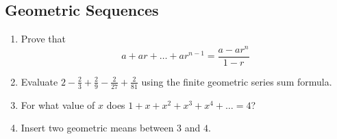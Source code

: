 \documentclass{article}
\begin{document}
\begin{multicols}{2}
        \subsection*{Geometric Sequences}
        \begin{enumerate}[resume]
            \item Prove that
            \[a + ar + \dots + ar^{n - 1} = \frac{a - ar^n}{1 - r}\]
            \vspace{3cm}
            \item Evaluate $2 - \frac{2}{3} + \frac{2}{9} - \frac{2}{27} +
            \frac{2}{81}$ using the finite geometric series sum formula.
            \vspace{3cm}
            \item For what value of $x$ does $1 + x + x^2 + x^3 + x^4 + \dots =
            4$?
            \vspace{3cm}
            \item Insert two geometric means between $3$ and $4$.
            \vspace{3cm}
        \end{enumerate}
    \end{multicols}
\end{document}
